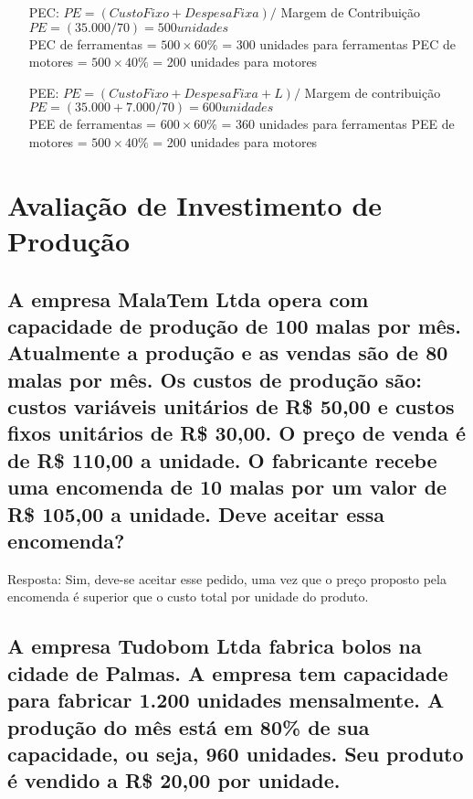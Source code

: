 \documentclass[report]{uftex}
\begin{document}
\begin{itemize}

\item [PEC:] $PE = (Custo Fixo + Despesa Fixa) /$ Margem de Contribuição \\
$PE = (35.000 / 70) = 500 unidades$ \\
PEC de ferramentas = $500 \times 60\%$ = 300 unidades para ferramentas
PEC de motores = $500 \times 40\%$ = 200 unidades para motores

\item [PEE:] $PE = (Custo Fixo + Despesa Fixa + L) /$ Margem de contribuição \\
$PE = (35.000 + 7.000/ 70) = 600 unidades$ \\
PEE de ferramentas = $600 \times 60\%$ = 360 unidades para ferramentas
PEE de motores = $500 \times 40\%$ = 200 unidades para motores

\end{itemize}

\chapter{Avaliação de Investimento de Produção}	

\section{A empresa MalaTem Ltda opera com capacidade de produção de 100 malas por mês. Atualmente a produção e as vendas são de 80 malas por mês. Os custos de produção são: custos variáveis unitários de R\$ 50,00 e custos fixos unitários de R\$ 30,00. O preço de venda é de R\$ 110,00 a unidade. O fabricante recebe uma encomenda de 10 malas por um valor de R\$ 105,00 a unidade. Deve aceitar essa encomenda?}

Resposta: Sim, deve-se aceitar esse pedido, uma vez que o preço proposto pela encomenda é superior que o custo total por unidade do produto. 

\section{A empresa Tudobom Ltda fabrica bolos na cidade de Palmas. A empresa tem capacidade para fabricar 1.200 unidades mensalmente. A produção do mês está em 80\% de sua capacidade, ou seja, 960 unidades. Seu produto é vendido a R\$ 20,00 por unidade.}
\end{document}
